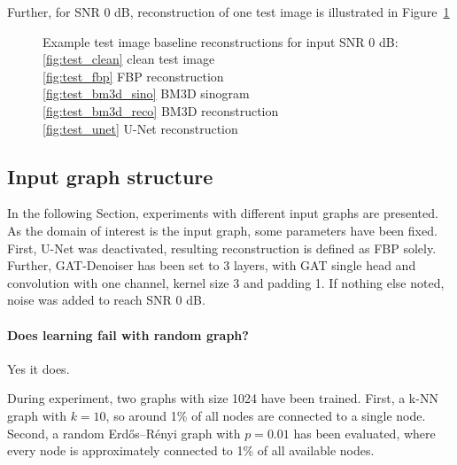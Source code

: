   Further, for SNR 0 dB, reconstruction of one test image is illustrated in Figure~\ref{fig:baseline_small}

  \begin{figure}[H]
    \label{fig:baseline_small}
    \hfill
    \hfill
    \hfill
    \hfill
    \hfill
    \hfill
	\caption{Example test image baseline reconstructions for input SNR 0 dB:\\
  \ref{fig:test_clean} clean test image \\
  \ref{fig:test_fbp} FBP reconstruction \\
  \ref{fig:test_bm3d_sino} BM3D sinogram \\
  \ref{fig:test_bm3d_reco} BM3D reconstruction \\
  \ref{fig:test_unet} U-Net reconstruction}
\end{figure}





  \subsection{Input graph structure}
  In the following Section, experiments with different input graphs are presented.
  As the domain of interest is the input graph, some parameters have been fixed.
  First, U-Net was deactivated, resulting reconstruction is defined as FBP solely.
  Further, GAT-Denoiser has been set to 3 layers, with GAT single head and convolution 
  with one channel, kernel size 3 and padding 1. 
  If nothing else noted, noise was added to reach SNR 0 dB.

  \paragraph{Does learning fail with random graph?}
  Yes it does.

  During experiment, two graphs with size 1024 have been trained.
  First, a k-NN graph with $k=10$, so around 1\%  of all nodes are connected to a single node.
  Second, a random Erdős–Rényi graph with $p=0.01$ has been evaluated, where every node is 
  approximately connected to 1\% of all available nodes.
  
